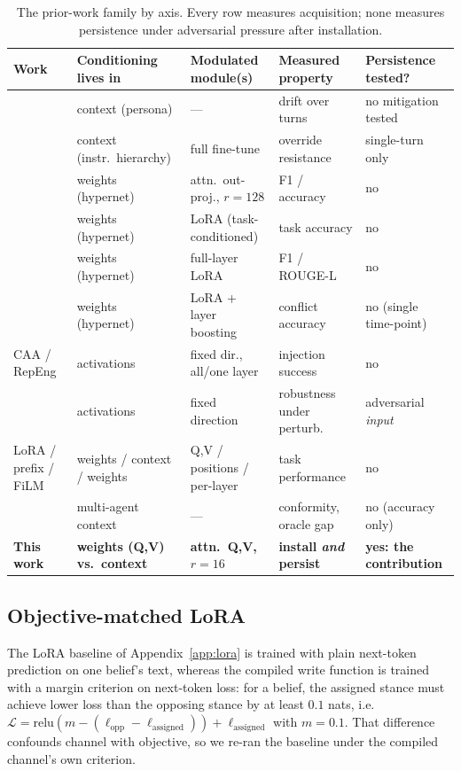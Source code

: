 \begin{table}[tb]
\centering
\caption{The prior-work family by axis. Every row measures acquisition; none measures
persistence under adversarial pressure after installation.}
\label{tab:related-axes}
\small
\setlength{\tabcolsep}{4pt}
\begin{tabular}{lllll}
\toprule
Work & Conditioning lives in & Modulated module(s) & Measured property & Persistence tested? \\
\midrule
\citet{choi2024identitydrift} & context (persona) & --- & drift over turns & no mitigation tested \\
\citet{wallace2024instruction} & context (instr.\ hierarchy) & full fine-tune & override resistance & single-turn only \\
\citet{chen2025generativeadapter} & weights (hypernet) & attn.\ out-proj., \(r{=}128\) & F1 / accuracy & no \\
\citet{charakorn2025texttolora} & weights (hypernet) & LoRA (task-conditioned) & task accuracy & no \\
\citet{liu2026shine} & weights (hypernet) & full-layer LoRA & F1 / ROUGE-L & no \\
\citet{cheng2026overridegap} & weights (hypernet) & LoRA + layer boosting & conflict accuracy & no (single time-point) \\
CAA / RepEng & activations & fixed dir., all/one layer & injection success & no \\
\citet{le2026steeringrobustness} & activations & fixed direction & robustness under perturb. & adversarial \emph{input} \\
LoRA / prefix / FiLM & weights / context / weights & Q,V / positions / per-layer & task performance & no \\
\citet{bertalanic2026costofconsensus} & multi-agent context & --- & conformity, oracle gap & no (accuracy only) \\
\textbf{This work} & \textbf{weights (Q,V) vs.\ context} & \textbf{attn.\ Q,V, \(r{=}16\)} & \textbf{install \emph{and} persist} & \textbf{yes: the contribution} \\
\bottomrule
\end{tabular}
\end{table}


\subsection{Objective-matched LoRA}
\label{app:loramargin}
The LoRA baseline of Appendix~\ref{app:lora} is trained with plain next-token prediction on one
belief's text, whereas the compiled write function is trained with a margin criterion on
next-token loss: for a belief, the assigned stance must achieve lower loss than the opposing
stance by at least \(0.1\) nats, i.e.\ \(\mathcal{L} = \mathrm{relu}\!\left(m - (\ell_{\text{opp}}
- \ell_{\text{assigned}})\right) + \ell_{\text{assigned}}\) with \(m=0.1\). That difference
confounds channel with objective, so we re-ran the baseline under the compiled channel's own
criterion.

